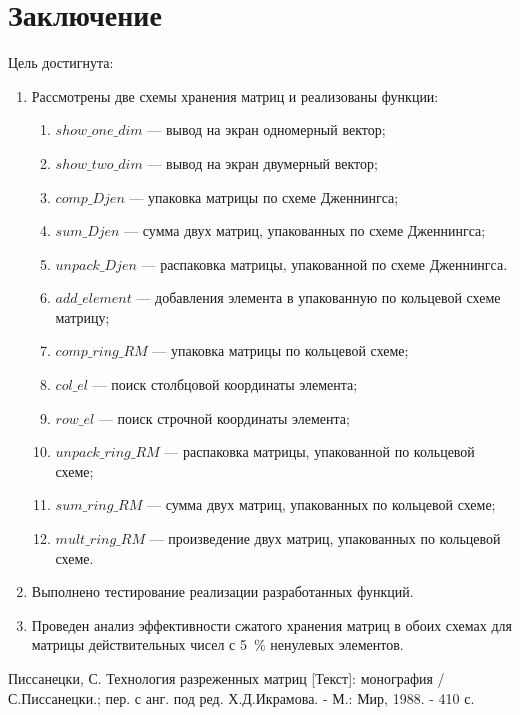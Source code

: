 \documentclass[12pt, a4paper]{article}
\begin{document}
\section{Заключение}
Цель достигнута: 
\begin{enumerate}
\item Рассмотрены две схемы хранения матриц и реализованы функции:
\begin{enumerate}
	\item $show\_one\_dim$ --- вывод на экран одномерный 
	вектор;
	\item $show\_two\_dim$ --- вывод на экран двумерный
	вектор;
	\item $comp\_Djen$ --- упаковка матрицы по схеме
	Дженнингса;
	\item $sum\_Djen$ --- сумма двух матриц, упакованных 
	по схеме Дженнингса;
	\item $unpack\_Djen$ --- распаковка матрицы, 
	упакованной по схеме Дженнингса.
	\item $add\_element$ --- добавления элемента в упакованную по кольцевой 
	схеме матрицу;
	\item $comp\_ring\_RM$ --- упаковка матрицы по 
	кольцевой схеме;
	\item $col\_el$ --- поиск столбцовой координаты
	элемента;
	\item $row\_el$ --- поиск строчной координаты
	элемента;
	\item $unpack\_ring\_RM$ --- распаковка матрицы, 
	упакованной по кольцевой схеме;
	\item $sum\_ring\_RM$ --- сумма двух матриц, 
	упакованных по кольцевой схеме;
	\item $mult\_ring\_RM$ --- произведение двух матриц, 
	упакованных по кольцевой схеме.
\end{enumerate}
\item Выполнено тестирование реализации разработанных функций.
\item Проведен анализ эффективности сжатого хранения матриц в обоих схемах для 
матрицы действительных чисел с 5~\% ненулевых элементов.
\end{enumerate}
\newpage
\begin{center}
\begin{thebibliography}{}
Писсанецки, С. Технология разреженных матриц [Текст]: монография / С.Писсанецки.; пер. с анг. под ред. Х.Д.Икрамова. - М.: Мир, 1988. - 410 с.
\end{thebibliography}
\end{center}
\end{document}
